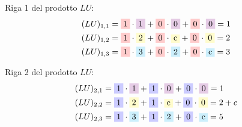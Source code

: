 \documentclass[12pt,a4paper]{article}
\begin{document}
\vspace{1em}

Riga 1 del prodotto \( LU \):
\[
\begin{aligned}
(LU)_{1,1} &= \colorbox{red!20}{1} \cdot \colorbox{violet!20}{1} + \colorbox{red!20}{0} \cdot \colorbox{violet!20}{0} + \colorbox{red!20}{0} \cdot \colorbox{violet!20}{0} = 1 \\
(LU)_{1,2} &= \colorbox{red!20}{1} \cdot \colorbox{yellow!20}{2} + \colorbox{red!20}{0} \cdot \colorbox{yellow!20}{c} + \colorbox{red!20}{0} \cdot \colorbox{yellow!20}{0} = 2 \\
(LU)_{1,3} &= \colorbox{red!20}{1} \cdot \colorbox{cyan!20}{3} + \colorbox{red!20}{0} \cdot \colorbox{cyan!20}{2} + \colorbox{red!20}{0} \cdot \colorbox{cyan!20}{c} = 3 \\
\end{aligned}
\]

\vspace{1em}

Riga 2 del prodotto \( LU \):
\[
\begin{aligned}
(LU)_{2,1} &= \colorbox{blue!20}{1} \cdot \colorbox{violet!20}{1} + \colorbox{blue!20}{1} \cdot \colorbox{violet!20}{0} + \colorbox{blue!20}{0} \cdot \colorbox{violet!20}{0} = 1 \\
(LU)_{2,2} &= \colorbox{blue!20}{1} \cdot \colorbox{yellow!20}{2} + \colorbox{blue!20}{1} \cdot \colorbox{yellow!20}{c} + \colorbox{blue!20}{0} \cdot \colorbox{yellow!20}{0} = 2 + c \\
(LU)_{2,3} &= \colorbox{blue!20}{1} \cdot \colorbox{cyan!20}{3} + \colorbox{blue!20}{1} \cdot \colorbox{cyan!20}{2} + \colorbox{blue!20}{0} \cdot \colorbox{cyan!20}{c} = 5 \\
\end{aligned}
\]

\vspace{1em}
\end{document}
